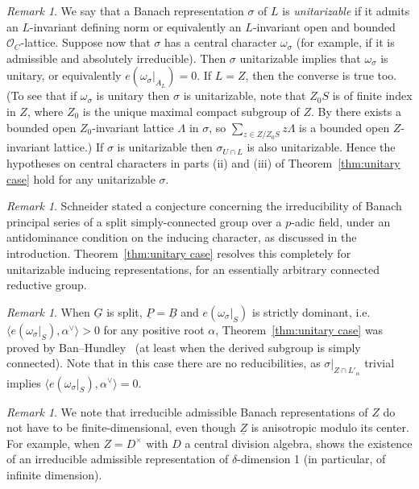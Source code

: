 \documentclass[a4paper]{amsart}
\numberwithin{equation}{section}
\theoremstyle{remark}
\newtheorem{remark}[thm]{Remark}
\theoremstyle{definition}
\newcommand{\alggrp}[1]{\underline{#1}}
\newcommand{\ang}[1]{\langle #1\rangle}
\begin{document}
\begin{remark}
We say that a Banach representation $\sigma$ of $L$ is \emph{unitarizable} if it admits an $L$-invariant defining norm or equivalently an $L$-invariant open and bounded $\mathcal{O}_C$-lattice.
Suppose now that $\sigma$ has a central character $\omega_{\sigma}$ (for example, if it is admissible and absolutely irreducible).
Then $\sigma$ unitarizable implies that $\omega_\sigma$ is unitary, or equivalently $e(\omega_{\sigma}|_{A_L}) = 0$. If $L = Z$, then the converse is true too.
(To see that if $\omega_\sigma$ is unitary then $\sigma$ is unitarizable, note that $Z_0 S$ is of finite index in $Z$, where $Z_0$ is the unique maximal compact subgroup of $Z$.
By \cite[Lemma 6.5.5]{locallyanalytic-memoir} there exists a bounded open $Z_0$-invariant lattice $\Lambda$ in $\sigma$, so $\sum_{z \in Z/Z_0S} z\Lambda$ is a bounded open $Z$-invariant lattice.)
If $\sigma$ is unitarizable then $\sigma_{U\cap L}$ is also unitarizable.
Hence the hypotheses on central characters in parts (ii) and (iii) of Theorem~\ref{thm:unitary case} hold for any unitarizable $\sigma$.
\end{remark}


\begin{remark}
  Schneider \cite[Conjecture~2.5]{MR2275644} stated a conjecture concerning the irreducibility of Banach principal series of a split simply-connected group
  over a $p$-adic field, under an antidominance condition on the inducing character, as discussed in the introduction.
  Theorem~\ref{thm:unitary case} resolves this completely for unitarizable inducing representations, for an essentially arbitrary connected reductive group.
\end{remark}

\begin{remark}
When $\alggrp{G}$ is split, $\alggrp{P} = \alggrp{B}$ and $e(\omega_\sigma|_S)$ is strictly dominant, i.e.\ $\langle e(\omega_\sigma|_S),\alpha^{\vee}\rangle > 0$ for any positive root $\alpha$, Theorem~\ref{thm:unitary case} was proved by Ban--Hundley~\cite{MR3537231} (at least when the derived subgroup is simply connected).
Note that in this case there are no reducibilities, as $\sigma|_{Z \cap L'_{\alpha}}$ trivial implies $\ang{e(\omega_\sigma|_S),\alpha^\vee} = 0$.
\end{remark}

\begin{remark}
  We note that irreducible admissible Banach representations of $Z$ do not have to be finite-dimensional, even though $\alggrp Z$ is anisotropic modulo its center.
  For example, when $Z = D^\times$ with $D$ a central division algebra, \cite{MR4404133} shows the existence of an irreducible admissible representation of $\delta$-dimension 1 (in particular, of infinite dimension).  
\end{remark}
\end{document}

